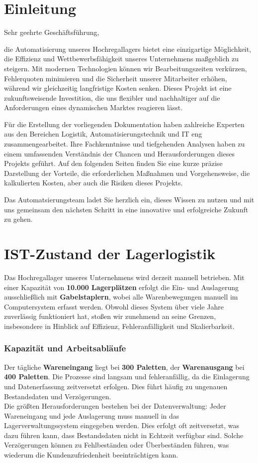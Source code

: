 \chapter{Einleitung}

Sehr geehrte Geschäftsführung,  

die Automatisierung unseres Hochregallagers bietet eine einzigartige Möglichkeit, die Effizienz und Wettbewerbsfähigkeit unseres Unternehmens maßgeblich zu steigern. Mit modernen Technologien können wir Bearbeitungszeiten verkürzen, Fehlerquoten minimieren und die Sicherheit unserer Mitarbeiter erhöhen, während wir gleichzeitig langfristige Kosten senken. Dieses Projekt ist eine zukunftsweisende Investition, die uns flexibler und nachhaltiger auf die Anforderungen eines dynamischen Marktes reagieren lässt.  

Für die Erstellung der vorliegenden Dokumentation haben zahlreiche Experten aus den Bereichen Logistik, Automatisierungstechnik und IT eng zusammengearbeitet. Ihre Fachkenntnisse und tiefgehenden Analysen haben zu einem umfassenden Verständnis der Chancen und Herausforderungen dieses Projekts geführt. Auf den folgenden Seiten finden Sie eine kurze präzise Darstellung der Vorteile, die erforderlichen Maßnahmen und Vorgehensweise, die kalkulierten Kosten, aber auch die Risiken dieses Projekts.  

Das Automatsierungsteam ladet Sie herzlich ein, dieses Wissen zu nutzen und mit uns gemeinsam den nächsten Schritt in eine innovative und erfolgreiche Zukunft zu gehen. 


\chapter{IST-Zustand der Lagerlogistik} 

Das Hochregallager unseres Unternehmens wird derzeit manuell betrieben. Mit einer Kapazität von \textbf{10.000 Lagerplätzen} erfolgt die Ein- und Auslagerung ausschließlich mit \textbf{Gabelstaplern}, wobei alle Warenbewegungen manuell im Computersystem erfasst werden. Obwohl dieses System über viele Jahre zuverlässig funktioniert hat, stoßen wir zunehmend an seine Grenzen, insbesondere in Hinblick auf Effizienz, Fehleranfälligkeit und Skalierbarkeit.

\subsection*{Kapazität und Arbeitsabläufe}
Der tägliche \textbf{Wareneingang} liegt bei \textbf{300 Paletten}, der \textbf{Warenausgang} bei \textbf{400 Paletten}. Die Prozesse sind langsam und fehleranfällig, da die Einlagerung und Datenerfassung zeitversetzt erfolgen. Dies führt häufig zu ungenauen Bestandsdaten und Verzögerungen.\\ 
Die größten Herausforderungen bestehen bei der Datenverwaltung: Jeder Wareneingang und jede Auslagerung muss manuell in das Lagerverwaltungssystem eingegeben werden. Dies erfolgt oft zeitversetzt, was dazu führen kann, dass Bestandsdaten nicht in Echtzeit verfügbar sind. Solche Verzögerungen können zu Fehlbeständen oder Überbeständen führen, was wiederum die Kundenzufriedenheit beeinträchtigen kann.

